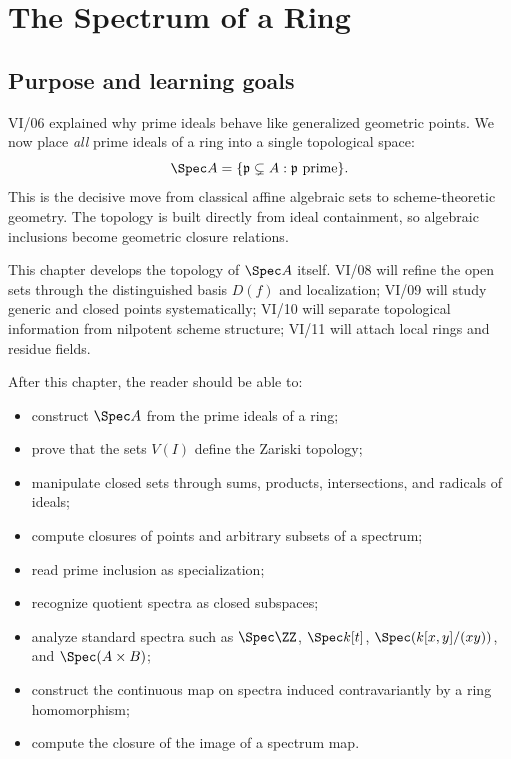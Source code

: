 
\chapter{The Spectrum of a Ring}
\label{ch:spectrum-of-a-ring}

\section*{Purpose and learning goals}

VI/06 explained why prime ideals behave like generalized geometric points.  We now place
\emph{all} prime ideals of a ring into a single topological space:
\[
\Spec A=\{\mathfrak p\subsetneq A:\mathfrak p\text{ prime}\}.
\]
This is the decisive move from classical affine algebraic sets to scheme-theoretic geometry.
The topology is built directly from ideal containment, so algebraic inclusions become
geometric closure relations.

This chapter develops the topology of $\Spec A$ itself.  VI/08 will refine the open sets
through the distinguished basis $D(f)$ and localization; VI/09 will study generic and closed
points systematically; VI/10 will separate topological information from nilpotent scheme
structure; VI/11 will attach local rings and residue fields.

After this chapter, the reader should be able to:
\begin{itemize}
\item construct $\Spec A$ from the prime ideals of a ring;
\item prove that the sets $V(I)$ define the Zariski topology;
\item manipulate closed sets through sums, products, intersections, and radicals of ideals;
\item compute closures of points and arbitrary subsets of a spectrum;
\item read prime inclusion as specialization;
\item recognize quotient spectra as closed subspaces;
\item analyze standard spectra such as $\Spec\ZZ$, $\Spec k[t]$, $\Spec(k[x,y]/(xy))$, and $\Spec(A\times B)$;
\item construct the continuous map on spectra induced contravariantly by a ring homomorphism;
\item compute the closure of the image of a spectrum map.
\end{itemize}

